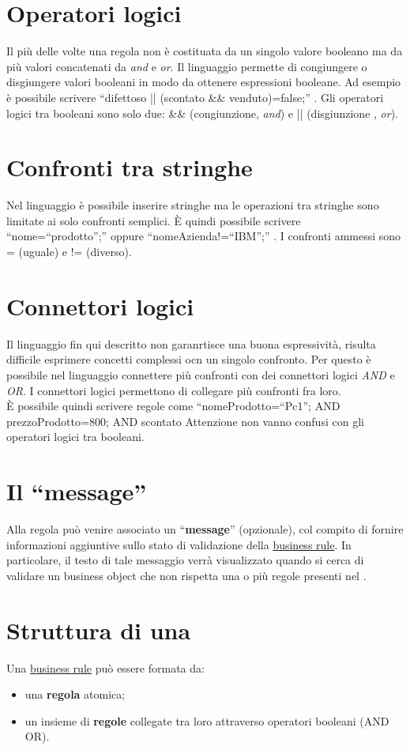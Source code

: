 \section{Operatori logici}
Il pi\`u delle volte una regola non \`e costituata da un singolo valore booleano ma da pi\`u valori concatenati da \textit{and} e \textit{or}. Il linguaggio permette di congiungere o disgiungere valori booleani in modo da ottenere espressioni booleane. Ad esempio \`e possibile scrivere ``difettoso || (scontato \&\& venduto)=false;'' . Gli operatori logici tra booleani sono solo due: \&\& (congiunzione, \textit{and}) e || (disgiunzione , \textit{or}).

\section{Confronti tra stringhe}
Nel linguaggio \`e possibile inserire stringhe ma le operazioni tra stringhe sono limitate ai solo confronti semplici. \`E quindi possibile scrivere ``nome=``prodotto'';'' oppure ``nomeAzienda!=``IBM'';'' . I confronti ammessi sono = (uguale) e != (diverso).

\section{Connettori logici}
Il linguaggio fin qui descritto non garanrtisce una buona espressivit\`a, risulta difficile esprimere concetti complessi ocn un singolo confronto. Per questo \`e possibile nel linguaggio connettere pi\`u confronti con dei connettori logici \textit{AND} e \textit{OR}. I connettori logici permettono di collegare pi\`u confronti fra loro.\\
\`E possibile quindi scrivere regole come ``nomeProdotto=``Pc1''; AND prezzoProdotto=800; AND scontato Attenzione non vanno confusi con gli operatori logici tra booleani.
\section{Il ``message''}

Alla regola pu\`o venire associato un ``\textbf{message}'' (opzionale), col compito di fornire informazioni aggiuntive sullo stato di validazione della \underline{business rule}. In particolare, il testo di tale messaggio verr\`a visualizzato quando si cerca di validare un business object che non rispetta una o pi\`u regole presenti nel \rp.

 \section{Struttura di una \br}
 Una \underline{business rule} pu\`o essere formata da:
 \begin{itemize}
 \item una \textbf{regola} atomica;
 \item un insieme di \textbf{regole} collegate tra loro attraverso operatori booleani (AND \textbar OR).
 \end{itemize}
 


